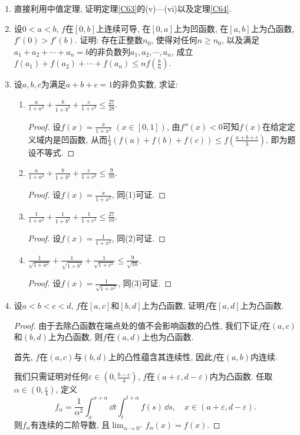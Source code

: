 \begin{3a}
\begin{enumerate}
\begin{proof}
\end{proof}
\item 直接利用中值定理, 证明定理\ref{C63}的(v)---(vi)以及定理\ref{C64}.
\item 设\(0<a<b\), \(f\)在\([0,b]\)上连续可导, 在\([0,a]\)上为凹函数, 在\([a,b]\)上为凸函数, \(f'(0)>f'(b)\). 
证明: 存在正整数\(n_0\), 使得对任何\(n\geqslant n_0\), 
以及满足\(a_1+a_2+\cdots+a_n=b\)的非负数列\(a_1,a_2,\cdots,a_n\), 
成立\(f(a_1)+f(a_2)+\cdots+f(a_n)\leqslant nf\left(\frac{b}{n}\right)\).
\item 设\(a,b,c\)为满足\(a+b+c=1\)的非负实数, 求证:
\begin{enumerate}[label=(\arabic*)]
\def\tempf#1{\frac{a}{1+a^#1}+\frac{b}{1+b^#1}+\frac{c}{1+c^#1}}
\def\tempff#1{\frac{1}{1+a^#1}+\frac{1}{1+b^#1}+\frac{1}{1+c^#1}}
\item \(\tempf{3}\leqslant\frac{27}{28}\).
\begin{proof}
设\(f(x)=\frac{x}{1+x^3}\) \((x\in[0,1])\), 由\(f''(x)<0\)可知\(f(x)\)在给定定义域内是凹函数, 
从而\(\frac{1}{3}\left(f(a)+f(b)+f(c)\right)\leqslant f\left(\frac{a+b+c}{3}\right)\), 即为题设不等式.
\end{proof}
\item \(\tempf{2}\leqslant\frac{9}{10}\).
\begin{proof}
设\(f(x)=\frac{x}{1+x^2}\), 同(1)可证. 
\end{proof}
\item \(\tempff{2}\leqslant\frac{27}{10}\).
\begin{proof}
设\(f(x)=\frac{1}{1+x^2}\), 同(2)可证.
\end{proof}
\item \(\frac{1}{\sqrt{1+a^2}}+\frac{1}{\sqrt{1+b^2}}+\frac{1}{\sqrt{1+c^2}}\leqslant\frac{9}{\sqrt{10}}\).
\begin{proof}
设\(f(x)=\frac{1}{\sqrt{1+x^2}}\), 同(3)可证.
\end{proof}
\end{enumerate}
\item 设\(a<b<c<d\), \(f\)在\([a,c]\)和\([b,d]\)上为凸函数, 证明\(f\)在\([a,d]\)上为凸函数.
\begin{proof}
由于去除凸函数在端点处的值不会影响函数的凸性, 我们下证\(f\)在\((a,c)\)和\((b,d)\)上为凸函数, 则\(f\)在\((a,d)\)上也为凸函数.

首先, \(f\)在\((a,c)\)与\((b,d)\)上的凸性蕴含其连续性, 因此\(f\)在\((a,b)\)内连续.

我们只需证明对任何\(\varepsilon\in\left(0,\frac{b-c}{4}\right)\), 
\(f\)在\((a+\varepsilon,d-\varepsilon)\)内为凸函数. 
任取\(\alpha\in\left(0,\frac{\varepsilon}{4}\right)\), 定义
\[f_{\alpha}=\frac{1}{\alpha^2}\int_{x}^{x+\alpha}\dd t\int_{t}^{t+\alpha}f(s)\,\dd s,\quad x\in(a+\varepsilon,d-\varepsilon).\]
则\(f_{\alpha}\)有连续的二阶导数, 且\(\lim_{\alpha\rightarrow 0^+}f_{\alpha}(x)=f(x)\).


\end{proof}
\end{enumerate}
\end{3a}
